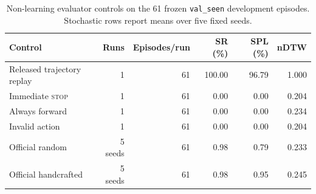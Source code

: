%
\begin{table}[t]
\centering
\small
\caption{Non-learning evaluator controls on the 61 frozen \texttt{val\_seen} development episodes. Stochastic rows report means over five fixed seeds.}
\label{tab:evaluator-controls}
\begin{tabular}{@{}lrrrrr@{}}
\toprule
Control & Runs & Episodes/run & SR (\%) & SPL (\%) & nDTW \\
\midrule
Released trajectory replay & 1 & 61 & 100.00 & 96.79 & 1.000 \\
Immediate \textsc{stop} & 1 & 61 & 0.00 & 0.00 & 0.204 \\
Always forward & 1 & 61 & 0.00 & 0.00 & 0.234 \\
Invalid action & 1 & 61 & 0.00 & 0.00 & 0.204 \\
Official random & 5 seeds & 61 & 0.98 & 0.79 & 0.233 \\
Official handcrafted & 5 seeds & 61 & 0.98 & 0.95 & 0.245 \\
\bottomrule
\end{tabular}
\end{table}
